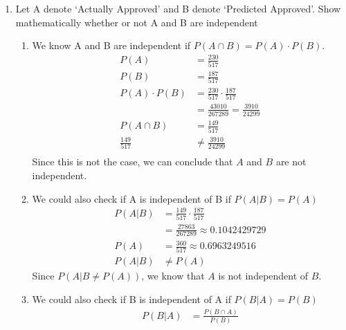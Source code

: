 \documentclass{article}
\begin{document}
\begin{enumerate}[label=\alph*)]
    \item Let A denote ‘Actually Approved’ and B denote ‘Predicted Approved’. Show
          mathematically whether or not A and B are independent
          \begin{enumerate}[label=Method \arabic*.]
              \item We know A and B are independent if \(P(A \cap B) = P(A) \cdot P(B)\).
                    \begin{align*}
                        P(A)            & = \frac{230}{517}                           \\
                        P(B)            & = \frac{187}{517}                           \\
                        P(A) \cdot P(B) & = \frac{230}{517} \cdot \frac{187}{517}     \\
                                        & = \frac{43010}{267289} = \frac{3910}{24299} \\
                        P(A \cap B)     & = \frac{149}{517}                           \\
                        \frac{149}{517} & \neq \frac{3910}{24299}                     \\
                    \end{align*}
                    Since this is not the case, we can conclude that \(A\) and \(B\) are not independent.
              \item We could also check if A is independent of B if \(P(A \vert B) = P(A)\)
                    \begin{align*}
                        P(A \vert B) & = \frac{149}{517} \cdot \frac{187}{517}     \\
                                     & = \frac{27863}{267289} \approx 0.1042429729 \\
                        P(A)         & = \frac{360}{517} \approx 0.6963249516      \\
                        P(A \vert B) & \neq P(A)
                    \end{align*}
                    Since \(P(A \vert B \neq P(A))\), we know that \(A\) is not independent of \(B\).
              \item We could also check if B is independent of A if \(P(B \vert A) = P(B)\)
                    \begin{align*}
                        P(B \vert A)           & = \frac{P(B \cap A)}{P(B)}                             \\

\end{align*}
\end{enumerate}
\end{enumerate}
\end{document}
